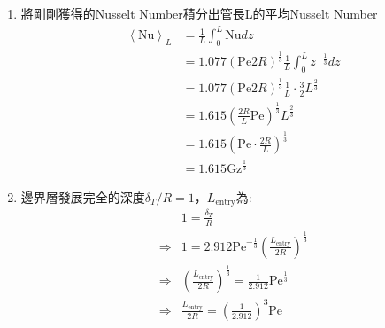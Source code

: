 \documentclass[../main.tex]{subfiles}
\begin{document}
\begin{itemize}
\begin{enumerate}
\begin{align}
{        \right)} \left(
          \frac{4\rho \hat C_P \overline u_z}{9 k R z}
        \right)^{\frac{1}{3}} \nonumber\\
      &= \frac{2}{\Gamma\left(
          \frac{4}{3}
        \right)} \left(
          \frac{4\rho \hat C_P \overline u_z R^2}{9 k z}
        \right)^{\frac{1}{3}} \nonumber\\
      &= \frac{2}{\Gamma\left(
          \frac{4}{3}
        \right)} \left(
          \frac{\text{Pe}}{9 (z/2R)}
        \right)^{\frac{1}{3}}
    \end{align}
    最後得到:
    \begin{equation}
      \boxed{\text{Nu} = 1.077 \text{Pe}^{\frac{1}{3}} \left(
        \frac{2R}{z}
      \right)^{\frac{1}{3}}} = 1.077 \text{Gz}^{\frac{1}{3}}
    \end{equation}
    \item 將剛剛獲得的Nusselt Number積分出管長L的平均Nusselt Number
    \begin{align}
      \left<\text{Nu}\right>_L &= \frac{1}{L} \int_0^L \text{Nu} dz \nonumber\\
      &= 1.077\left( \text{Pe} 2R\right)^{\frac{1}{3}}\frac{1}{L}  \int_0^L z^{-\frac{1}{3}} dz \nonumber\\
      &= 1.077\left( \text{Pe} 2R\right)^{\frac{1}{3}}\frac{1}{L} \cdot\frac{3}{2} L^{\frac{2}{3}} \nonumber\\
      &= 1.615 \left( \frac{2R}{L} \text{Pe} \right)^{\frac{1}{3}} L^{\frac{2}{3}} \nonumber\\
      &= 1.615 \left(
        \text{Pe}\cdot \frac{2R}{L}
      \right)^{\frac{1}{3}} \nonumber\\
      &= 1.615 \text{Gz}^{\frac{1}{3}} \label{eq:leveque_average_nusselt_number}
    \end{align}
    \item 邊界層發展完全的深度$\delta_T/R = 1$，$L_{\text{entry}}$為:
    \begin{align}
      &1 = \frac{\delta_T}{R} \nonumber\\
      \Rightarrow & 1 = 2.912 \text{Pe}^{-\frac{1}{3}} \left(
        \frac{L_{\text{entry}}}{2R}
      \right)^{\frac{1}{3}} \nonumber\\
      \Rightarrow & \left(\frac{L_{\text{entry}}}{2R}\right)^{\frac{1}{3}} = \frac{1}{2.912} \text{Pe}^{\frac{1}{3}} \nonumber\\
      \Rightarrow & \frac{L_{\text{entry}}}{2R} = \left(
        \frac{1}{2.912}
      \right)^3 \text{Pe} \nonumber\\

\end{align}
\end{enumerate}
\end{itemize}
\end{document}

